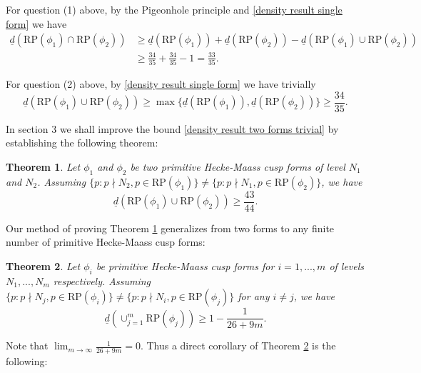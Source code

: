 \documentclass[10pt,leqno]{amsart}
\theoremstyle{plain}
\newtheorem{theorem}{Theorem}
\theoremstyle{definition}
\theoremstyle{remark}
\numberwithin{equation}{section}
\newcommand{\RP}{\text{RP}}
\begin{document}
For question (1) above, by the Pigeonhole principle and \eqref{density result single form} we have 
\begin{align*}
    \underline{d}(\RP(\phi_1)\cap \RP(\phi_2)) &\geq \underline{d}(\RP(\phi_1)) + \underline{d}(\RP(\phi_2)) - \underline{d}(\RP(\phi_1) \cup \RP(\phi_2)) \\
    &\geq \frac{34}{35}+\frac{34}{35}-1 = \frac{33}{35}.
\end{align*}

For question (2) above, by \eqref{density result single form} we have trivially 
\begin{equation}\label{density result two forms trivial}
    \underline{d}(\RP(\phi_1) \cup \RP(\phi_2)) \geq \max\{\underline{d}(\RP(\phi_1)),\underline{d}(\RP(\phi_2))\} \geq \frac{34}{35}.
\end{equation}

In section 3 we shall improve the bound \eqref{density result two forms trivial} by establishing the following theorem:

\begin{theorem}\label{main theorem density two forms}
    Let $\phi_1$ and $\phi_2$ be two primitive Hecke-Maass cusp forms of level $N_1$ and $N_2$. Assuming $\{p:p \nmid N_2,p \in \RP(\phi_1)\} \neq \{p:p \nmid N_1, p \in \RP(\phi_2)\}$, we have
    \begin{equation}
        \underline{d}(\RP(\phi_1) \cup \RP(\phi_2)) \geq \frac{43}{44}.
    \end{equation}
\end{theorem}

Our method of proving Theorem \ref{main theorem density two forms} generalizes from two forms to any finite number of primitive Hecke-Maass cusp forms:

\begin{theorem}\label{main theorem density finitely many forms}
    Let $\phi_i$ be primitive Hecke-Maass cusp forms for $i = 1, ...,m$ of levels $N_1, ...,N_m$ respectively. Assuming $\{p:p \nmid N_j,p \in \RP(\phi_i)\} \neq \{p:p \nmid N_i, p \in \RP(\phi_j)\}$ for any $i \neq j$, we have 
    \begin{equation}
        \underline{d}(\cup_{j=1}^m \RP(\phi_j)) \geq 1-\frac{1}{26+9m}.
    \end{equation}
\end{theorem}

Note that $\lim_{m \to \infty} \frac{1}{26+9m} = 0$. Thus a direct corollary of Theorem \ref{main theorem density finitely many forms} is the following:
\end{document}
